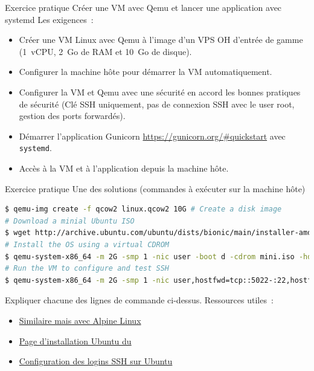 \documentclass{beamer}
\begin{document}
    \begin{frame}{Exercice pratique \execcounterdispinc{}}{Créer une VM avec Qemu et lancer une application avec systemd}
        Les exigences~:
        \begin{itemize}
            \item Créer une VM Linux avec Qemu à l'image d'un VPS OH d'entrée de gamme (1~vCPU, 2~Go de RAM et 10~Go de disque).
            \item Configurer la machine hôte pour démarrer la VM automatiquement.
            \item Configurer la VM et Qemu avec une sécurité en accord les bonnes pratiques de sécurité (Clé SSH uniquement, pas de connexion SSH avec le user root, gestion des ports forwardés).
            \item Démarrer l'application Gunicorn  \url{https://gunicorn.org/\#quickstart} avec \lstinline{systemd}.
            \item Accès à la VM et à l'application depuis la machine hôte.
        \end{itemize}
    \end{frame}

    \begin{frame}[fragile]{Exercice pratique \execcounterdispinc{}}{Une des solutions (commandes à exécuter sur la machine hôte)}
        \begin{lstlisting}[language=bash]
$ qemu-img create -f qcow2 linux.qcow2 10G # Create a disk image
# Download a minial Ubuntu ISO
$ wget http://archive.ubuntu.com/ubuntu/dists/bionic/main/installer-amd64/current/images/netboot/mini.iso
# Install the OS using a virtual CDROM
$ qemu-system-x86_64 -m 2G -smp 1 -nic user -boot d -cdrom mini.iso -hda linux.qcow2 -k fr -enable-kvm
# Run the VM to configure and test SSH
$ qemu-system-x86_64 -m 2G -smp 1 -nic user,hostfwd=tcp::5022-:22,hostfwd=tcp::5080-:80 -display none -hda linux.qcow2 -k fr -enable-kvm
        \end{lstlisting}
        Expliquer chacune des lignes de commande ci-dessus.
        \bigbreak
        Ressources utiles~:
        \begin{itemize}
            \item \href{https://wiki.alpinelinux.org/wiki/Install_Alpine_in_QEMU}{Similaire mais avec Alpine Linux}
            \item \href{https://help.ubuntu.com/community/Installation/MinimalCD\#A64-bit_PC_.28amd64.2C_x86_64.29_.28Recommended.29}{Page d'installation Ubuntu du  }
            \item \href{https://phoenixnap.com/kb/generate-setup-ssh-key-ubuntu}{Configuration des logins SSH sur Ubuntu}
        \end{itemize}
    \end{frame}
\end{document}
